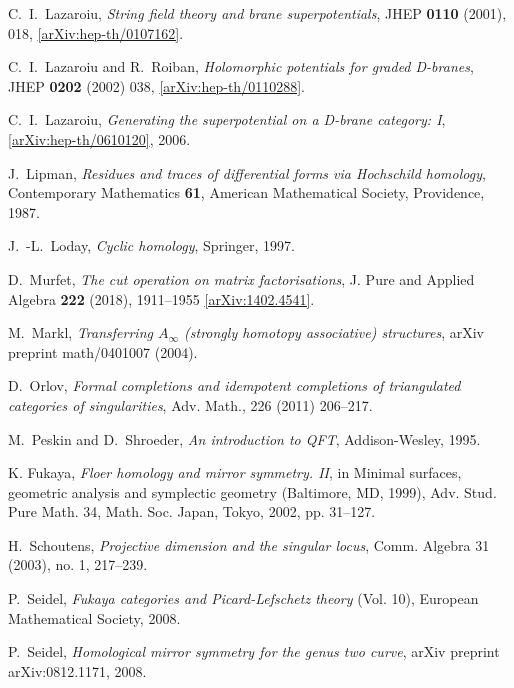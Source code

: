 \documentclass[english,letter paper,12pt,leqno]{article}
\theoremstyle{example}
\numberwithin{equation}{section}
\begin{document}
\begin{thebibliography}{BHLS03}

C.~I.~Lazaroiu, \textsl{String field theory and brane superpotentials}, JHEP \textbf{0110} (2001), 018, \href{https://arxiv.org/abs/hep-th/0107162}{[arXiv:hep-th/0107162]}.

C.~I.~Lazaroiu and R.~Roiban, \textsl{Holomorphic potentials for graded D-branes}, JHEP \textbf{0202} (2002) 038, \href{https://arxiv.org/abs/hep-th/0110288}{[arXiv:hep-th/0110288]}.

C.~I.~Lazaroiu, \textsl{Generating the superpotential on a D-brane category: I}, \href{https://arxiv.org/abs/hep-th/0610120}{[arXiv:hep-th/0610120]}, 2006.
  
J.~Lipman, \textsl{Residues and traces of differential forms via {H}ochschild
  homology}, Contemporary Mathematics \textbf{61}, American Mathematical Society,
  Providence, 1987.

J.~-L.~Loday, \textsl{Cyclic homology}, Springer, 1997.

D.~Murfet, \textsl{The cut operation on matrix factorisations}, J. Pure and Applied Algebra \textbf{222} (2018), 1911--1955 \href{http://arxiv.org/abs/1402.4541}{[arXiv:1402.4541]}.

M.~Markl, \textsl{Transferring $A_\infty$ (strongly homotopy associative) structures}, arXiv preprint math/0401007 (2004).

D.~Orlov, \textsl{Formal completions and idempotent completions of triangulated categories of singularities}, Adv. Math., 226 (2011) 206--217.

M.~Peskin and D.~Shroeder, \textsl{An introduction to QFT}, Addison-Wesley, 1995.

K. Fukaya, \textsl{Floer homology and mirror symmetry. II}, in Minimal surfaces, geometric analysis and symplectic geometry (Baltimore, MD, 1999), Adv. Stud. Pure Math. 34, Math. Soc. Japan, Tokyo, 2002, pp. 31–127.

H.~Schoutens, \textsl{Projective dimension and the singular locus}, Comm. Algebra 31 (2003), no. 1, 217--239.

P.~Seidel, \textsl{Fukaya categories and Picard-Lefschetz theory} (Vol. 10), European Mathematical Society, 2008.

P.~Seidel, \textsl{Homological mirror symmetry for the genus two curve}, arXiv preprint arXiv:0812.1171, 2008.


\end{thebibliography}
\end{document}
